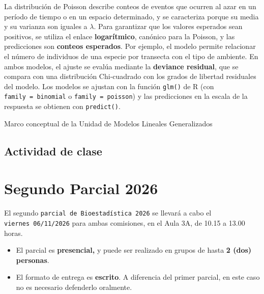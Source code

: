 \documentclass[
  spanish,
  letterpaper,
  DIV=11,
  numbers=noendperiod]{scrreprt}
\begin{document}
La distribución de Poisson describe conteos de eventos que ocurren al
azar en un período de tiempo o en un espacio determinado, y se
caracteriza porque su media y su varianza son iguales a \(\lambda\).
Para garantizar que los valores esperados sean positivos, se utiliza el
enlace \textbf{logarítmico}, canónico para la Poisson, y las
predicciones son \textbf{conteos esperados}. Por ejemplo, el modelo
permite relacionar el número de individuos de una especie por transecta
con el tipo de ambiente. En ambos modelos, el ajuste se evalúa mediante
la \textbf{deviance residual}, que se compara con una distribución
Chi-cuadrado con los grados de libertad residuales del modelo. Los
modelos se ajustan con la función \texttt{glm()} de R (con
\texttt{family\ =\ binomial} o \texttt{family\ =\ poisson}) y las
predicciones en la escala de la respuesta se obtienen con
\texttt{predict()}.

Marco conceptual de la Unidad de Modelos Lineales Generalizados

\section{\texorpdfstring{\textbf{Actividad de
clase}}{Actividad de clase}}\label{actividad-de-clase-5}


\chapter*{Segundo Parcial \textbar{} 2026}\label{segundo-parcial-2026}


El segundo \texttt{parcial\ de\ Bioestadística\ 2026} se llevará a cabo
el \texttt{viernes\ 06/11/2026} para ambas comisiones, en el Aula 3A, de
10.15 a 13.00 horas.

\begin{tcolorbox}[enhanced jigsaw, arc=.35mm, bottomrule=.15mm, bottomtitle=1mm, breakable, colback=white, colbacktitle=quarto-callout-important-color!10!white, colframe=quarto-callout-important-color-frame, coltitle=black, left=2mm, leftrule=.75mm, opacityback=0, opacitybacktitle=0.6, rightrule=.15mm, title=\textcolor{quarto-callout-important-color}{\faExclamation}\hspace{0.5em}{Pautas}, titlerule=0mm, toprule=.15mm, toptitle=1mm]

\begin{itemize}
\item
  El parcial es \textbf{presencial,} y puede ser realizado en grupos de
  hasta \textbf{2 (dos) personas}.
\item
  El formato de entrega es \textbf{escrito}. A diferencia del primer
  parcial, en este caso no es necesario defenderlo oralmente.
\end{itemize}

\end{tcolorbox}
\end{document}
